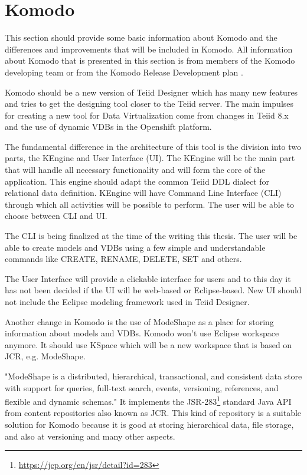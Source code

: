 \documentclass[12pt,oneside]{fithesis2}
\begin{document}
\section{Komodo}
\par This section should provide some basic information about Komodo and the differences and improvements that will be included in Komodo. All information about Komodo that is presented in this section is from members of the Komodo developing team or from the Komodo Release Development plan \cite{Komodo}. 
\par Komodo should be a new version of Teiid Designer which has many new features and tries to get the designing tool closer to the Teiid server. The main impulses for creating a new tool for Data Virtualization come from changes in Teiid 8.x and the use of dynamic VDBs in the Openshift platform.  
\par The fundamental difference in the architecture of this tool is the division into two parts, the KEngine and User Interface (UI). The KEngine will be the main part that will handle all necessary functionality and will form the core of the application. This engine should adapt the common Teiid DDL dialect for relational data definition. KEngine will have Command Line Interface (CLI) through which all activities will be possible to perform. The user will be able to choose between CLI and UI.
\par The CLI is being finalized at the time of the writing this thesis. The user will be able to create models and VDBs using a few simple and understandable commands like CREATE, RENAME, DELETE, SET and others.
\par The User Interface will provide a clickable interface for users and to this day it has not been decided if the UI will be web-based or Eclipse-based. New UI should not include the Eclipse modeling framework used in Teiid Designer.
\par Another change in Komodo is the use of ModeShape as a place for storing information about models and VDBs. Komodo won't use Eclipse workspace anymore. It should use KSpace which will be a new workspace that is based on JCR, e.g. ModeShape. 
\par "ModeShape is a distributed, hierarchical, transactional, and consistent data store with support for queries, full-text search, events, versioning, references, and flexible and dynamic schemas."\cite{ModeShape} It implements the JSR-283\footnote{\url{https://jcp.org/en/jsr/detail?id=283}} standard Java API from content repositories also known as JCR. This kind of repository is a suitable solution for Komodo because it is good at storing hierarchical data, file storage, and also at versioning and many other aspects. 
\end{document}
